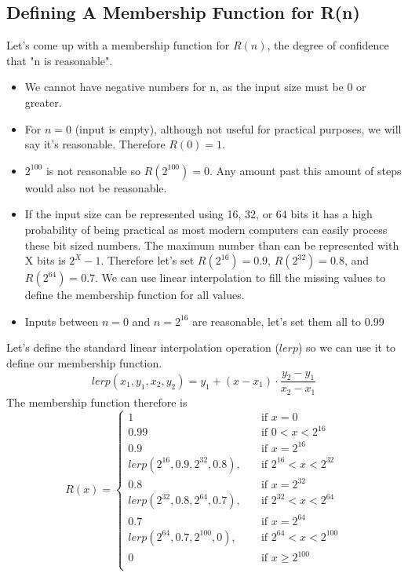 \documentclass[draft]{article}
\theoremstyle{definition}
\begin{document}
\subsection{Defining A Membership Function for R(n)}
Let's come up with a membership function for $R(n)$, the degree of confidence that "n is reasonable". 
\begin{itemize}
    \item We cannot have negative numbers for n, as the input size must be 0 or greater.
    \item For $n=0$ (input is empty), although not useful for practical purposes, we will say it's reasonable. Therefore $R(0)=1$. 
    \item $2^{100}$ is not reasonable so $R(2^{100})=0$. Any amount past this amount of steps would also not be reasonable.
    \item If the input size can be represented using 16, 32, or 64 bits it has a high probability of being practical as most modern computers can easily process these bit sized numbers. The maximum number than can be represented with X bits is $2^{X}-1$. Therefore let's set $R(2^{16})=0.9$, $R(2^{32})=0.8$, and $R(2^{64})=0.7$. We can use linear interpolation to fill the missing values to define the membership function for all values.
    \item Inputs between $n=0$ and $n=2^{16}$ are reasonable, let's set them all to 0.99
\end{itemize}

Let's define the standard linear interpolation operation ($lerp$) so we can use it to define our membership function.
\begin{equation}
lerp(x_1, y_1, x_2, y_2) = y_1 + (x-x_1) \cdot \dfrac{y_2-y_1}{x_2-x_1}
\end{equation}
The membership function therefore is
\begin{equation}
R(x)=
  \begin{cases}
    1 & \quad \text{if } x=0 \\
    0.99 &\quad \text{if } 0 < x < 2^{16} \\
    0.9 &\quad \text{if } x=2^{16} \\
    lerp(2^{16}, 0.9, 2^{32}, 0.8),  & \quad \text{if } 2^{16} < x < 2^{32} \\
    0.8 &\quad \text{if } x=2^{32} \\
    lerp(2^{32}, 0.8, 2^{64}, 0.7),  & \quad \text{if } 2^{32} < x < 2^{64} \\
    0.7 &\quad \text{if } x=2^{64} \\
    lerp(2^{64}, 0.7, 2^{100}, 0),  & \quad \text{if } 2^{64} < x < 2^{100} \\
    0 & \quad \text{if } x \geq 2^{100} \\
  \end{cases}
\end{equation}
\end{document}
